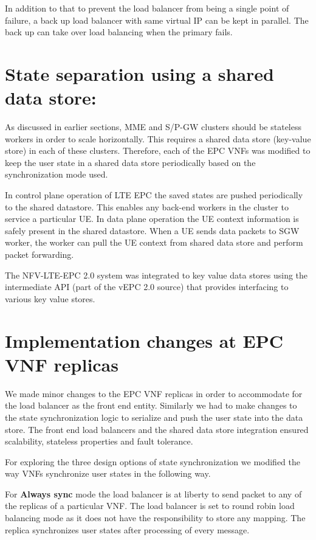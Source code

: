 \documentclass[hidelinks]{report}
\begin{document}
In addition to that to prevent the load balancer from being a single point of failure, a back up load balancer with same virtual IP can be kept in parallel. The back up can take over load balancing when the primary fails.
\section*{State separation using a shared data store:}

As discussed in earlier sections, MME and S/P-GW clusters should be stateless workers in order to scale horizontally. This requires a shared data store (key-value store) in each of these clusters. Therefore, each of the EPC VNFs was modified to keep the user state in a shared data store periodically based on the synchronization mode used.

\par In control plane operation of LTE EPC the saved states are pushed periodically to the shared datastore. This enables any back-end workers in the cluster to service a particular UE. In data plane operation the UE context information is safely present in the shared datastore. When a UE sends data packets to SGW worker, the worker can pull the UE context from shared data store and perform packet forwarding.

\par The NFV-LTE-EPC 2.0 system was integrated to key value data stores using the  intermediate API (part of the vEPC 2.0 source) that provides interfacing to various key value stores.

\section*{Implementation changes at EPC VNF replicas}

We made minor changes to the EPC VNF replicas in order to accommodate for the load balancer as the front end entity. Similarly we had to make changes to the state synchronization logic to serialize and push the user state into the data store. The front end load balancers and the shared data store integration ensured scalability, stateless properties and fault tolerance. 

\par For exploring the three design options of state synchronization we modified the way VNFs synchronize user states in the following way. 

For \textbf{Always sync} mode the load balancer is at liberty to send packet to any of the replicas of a particular VNF. The load balancer is set to round robin load balancing mode as it does not have the responsibility to store any mapping. The replica synchronizes user states after processing of every message.
\end{document}

